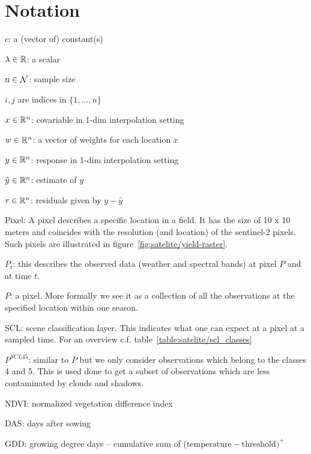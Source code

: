 \chapter*{Notation}
\label{c:Notation}

$c$: a (vector of) constant(s)

$\lambda \in \mathbb{R}$: a scalar

$n\in \operatorname{\mathcal{N}}$: sample size

$i,j$ are indices in $\{1,\dots,n\}$

$x\in \mathbb{R}^n$: covariable in 1-dim interpolation setting

$w \in \mathbb{R}^n$: a vector of weights for each location $x$

$y\in \mathbb{R}^n$: response in 1-dim interpolation setting

$\hat y\in \mathbb{R}^n$: estimate of $y$

$r \in \mathbb{R}^n$: residuals given by $y - \hat y$



Pixel: A pixel describes a specific location in a field. It has the size of 10 x 10 meters and coincides with the resolution (and location) of the sentinel-2 pixels. Such pixels are illustrated in figure~\ref{fig:satelite/yield-raster}.

$P_t$: this describes the observed data (weather and spectral bands) at pixel $P$ and at time $t$.

$P$: a pixel. More formally we see it as a collection of all the observations at the specified location within one season. %

SCL: scene classification layer. This indicates what one can expect at a pixel at a sampled time. For an overview c.f. table~\ref{table:satelite/scl_classes}

$P^{SCL45}$: similar to $P$ but we only consider observations which belong to the classes 4 and 5. This is used done to get a subset of observations which are less contaminated by clouds and shadows.

NDVI: normalized vegetation difference index

DAS: days after sowing

GDD: growing degree days -- cumulative sum of ($\text{temperature}-\text{threshold})^+$


